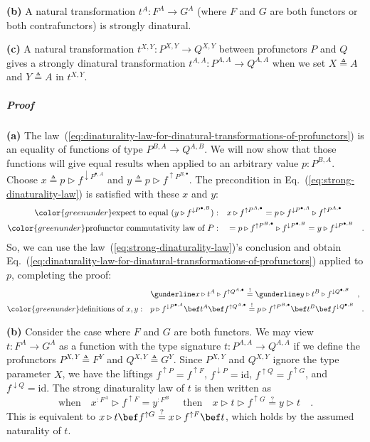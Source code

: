 \textbf{(b)} A natural transformation $t^{A}:F^{A}\rightarrow G^{A}$
(where $F$ and $G$ are both functors or both contrafunctors) is
strongly dinatural.

\textbf{(c)} A natural transformation $t^{X,Y}:P^{X,Y}\rightarrow Q^{X,Y}$
between profunctors $P$ and $Q$ gives a strongly dinatural transformation
$t^{A,A}:P^{A,A}\rightarrow Q^{A,A}$ when we set $X\triangleq A$
and $Y\triangleq A$ in $t^{X,Y}$.

\subparagraph{Proof}

\textbf{(a)} The law~(\ref{eq:dinaturality-law-for-dinatural-transformations-of-profunctors})
is an equality of functions of type $P^{B,A}\rightarrow Q^{A,B}$.
We will now show that those functions will give equal results when
applied to an arbitrary value $p:P^{B,A}$. Choose $x\triangleq p\triangleright f^{\downarrow P^{\bullet,A}}$
and $y\triangleq p\triangleright f^{\uparrow P^{B,\bullet}}$. The
precondition in Eq.~(\ref{eq:strong-dinaturality-law}) is satisfied
with these $x$ and $y$:
\begin{align*}
{\color{greenunder}\text{expect to equal }(y\triangleright f^{\downarrow P^{\bullet,B}}):}\quad & x\triangleright f^{\uparrow P^{A,\bullet}}=p\triangleright f^{\downarrow P^{\bullet,A}}\triangleright f^{\uparrow P^{A,\bullet}}\\
{\color{greenunder}\text{profunctor commutativity law of }P:}\quad & =p\triangleright f^{\uparrow P^{B,\bullet}}\triangleright f^{\downarrow P^{\bullet,B}}=y\triangleright f^{\downarrow P^{\bullet,B}}\quad.
\end{align*}
So, we can use the law~(\ref{eq:strong-dinaturality-law})\textsf{'}s conclusion
and obtain Eq.~(\ref{eq:dinaturality-law-for-dinatural-transformations-of-profunctors})
applied to $p$, completing the proof:
\begin{align*}
 & \gunderline x\triangleright t^{A}\triangleright f^{\uparrow Q^{A,\bullet}}\overset{!}{=}\gunderline y\triangleright t^{B}\triangleright f^{\downarrow Q^{\bullet,B}}\quad,\\
{\color{greenunder}\text{definitions of }x,y:}\quad & p\triangleright f^{\downarrow P^{\bullet,A}}\bef t^{A}\bef f^{\uparrow Q^{A,\bullet}}\overset{!}{=}p\triangleright f^{\uparrow P^{B,\bullet}}\bef t^{B}\bef f^{\downarrow Q^{\bullet,B}}\quad.
\end{align*}

\textbf{(b)} Consider the case where $F$ and $G$ are both functors.
We may view $t:F^{A}\rightarrow G^{A}$ as a function with the type
signature $t:P^{A,A}\rightarrow Q^{A,A}$ if we define the profunctors
$P^{X,Y}\triangleq F^{Y}$ and $Q^{X,Y}\triangleq G^{Y}$. Since $P^{X,Y}$
and $Q^{X,Y}$ ignore the type parameter $X$, we have the liftings
$f^{\uparrow P}=f^{\uparrow F}$, $f^{\downarrow P}=\text{id}$, $f^{\uparrow Q}=f^{\uparrow G}$,
and $f^{\downarrow Q}=\text{id}$. The strong dinaturality law of
$t$ is then written as
\[
\text{when}\quad x^{:F^{A}}\triangleright f^{\uparrow F}=y^{:F^{B}}\quad\text{ then}\quad x\triangleright t\triangleright f^{\uparrow G}\overset{?}{=}y\triangleright t\quad.
\]
This is equivalent to $x\triangleright t\bef f^{\uparrow G}\overset{?}{=}x\triangleright f^{\uparrow F}\bef t$,
which holds by the assumed naturality of $t$.

